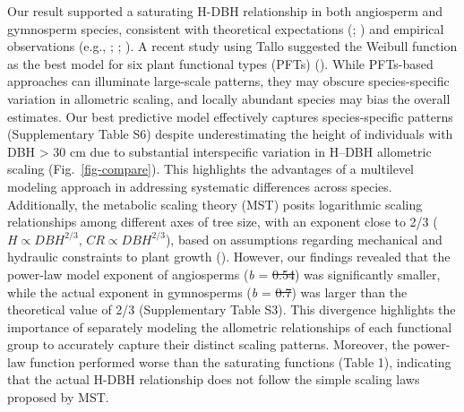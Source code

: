 \documentclass[
  12pt,
  letterpaper,
  DIV=11,
  numbers=noendperiod]{scrartcl}
\providecommand{\DIFadd}[1]{{\protect\color{blue}\uwave{#1}}} %
\providecommand{\DIFdel}[1]{{\protect\color{red}\sout{#1}}}                      %
\providecommand{\DIFaddbegin}{} %
\providecommand{\DIFaddend}{} %
\providecommand{\DIFdelbegin}{} %
\providecommand{\DIFdelend}{} %
\newcommand{\DIFscaledelfig}{0.5}
\newlength{\DIFdelgraphicswidth} %
\newlength{\DIFdelgraphicsheight} %
\newcommand{\DIFaddincludegraphics}[2][]{{\color{blue}\fbox{\DIFOincludegraphics[#1]{#2}}}} %
\newcommand{\DIFdelincludegraphics}[2][]{%
\sbox{\DIFdelgraphicsbox}{\DIFOincludegraphics[#1]{#2}}%
\settoboxwidth{\DIFdelgraphicswidth}{\DIFdelgraphicsbox} %
\settoboxtotalheight{\DIFdelgraphicsheight}{\DIFdelgraphicsbox} %
\scalebox{\DIFscaledelfig}{%
\parbox[b]{\DIFdelgraphicswidth}{\usebox{\DIFdelgraphicsbox}\\[-\baselineskip] \rule{\DIFdelgraphicswidth}{0em}}\llap{\resizebox{\DIFdelgraphicswidth}{\DIFdelgraphicsheight}{%
\setlength{\unitlength}{\DIFdelgraphicswidth}%
\begin{picture}(1,1)%
\thicklines\linethickness{2pt} %
{\color[rgb]{1,0,0}\put(0,0){\framebox(1,1){}}}%
{\color[rgb]{1,0,0}\put(0,0){\line( 1,1){1}}}%
{\color[rgb]{1,0,0}\put(0,1){\line(1,-1){1}}}%
\end{picture}%
}\hspace*{3pt}}} %
} %
\DeclareRobustCommand{\DIFaddbegin}{\DIFOaddbegin \let\includegraphics\DIFaddincludegraphics} %
\DeclareRobustCommand{\DIFaddend}{\DIFOaddend \let\includegraphics\DIFOincludegraphics} %
\DeclareRobustCommand{\DIFdelbegin}{\DIFOdelbegin \let\includegraphics\DIFdelincludegraphics} %
\DeclareRobustCommand{\DIFdelend}{\DIFOaddend \let\includegraphics\DIFOincludegraphics} %
\begin{document}
Our result supported a saturating H-DBH relationship in both angiosperm
and gymnosperm species, consistent with theoretical expectations
(;
) and empirical observations
(e.g., ;
;
). A recent study using Tallo
suggested the Weibull function as the best model for six plant
functional types (PFTs) ().
While PFTs-based approaches can illuminate large-scale patterns, they
may obscure species-specific variation in allometric scaling, and
locally abundant species may bias the overall estimates. Our best
predictive model effectively captures species-specific patterns
(Supplementary Table S6) despite underestimating the height of
individuals with DBH \textgreater{} 30 cm due to substantial
interspecific variation in H--DBH allometric scaling
(Fig.~\ref{fig-compare}). This highlights the advantages of a multilevel
modeling approach in addressing systematic differences across species.
Additionally, the metabolic scaling theory (MST) posits logarithmic
scaling relationships among different axes of tree size, with an
exponent close to 2/3 (\(H \propto DBH^{2/3}\),
\(CR \propto DBH^{2/3}\)), based on assumptions regarding mechanical and
hydraulic constraints to plant growth (). However, our findings revealed that the power-law model
exponent of angiosperms (\emph{b} = \DIFdelbegin \DIFdel{0.54}\DIFdelend \DIFaddbegin \DIFadd{0.538}\DIFaddend ) was significantly smaller,
while the actual exponent in gymnosperms (\emph{b} = \DIFdelbegin \DIFdel{0.7}\DIFdelend \DIFaddbegin \DIFadd{0.704}\DIFaddend ) was larger
than the theoretical value of 2/3 (Supplementary Table S3). This
divergence highlights the importance of separately modeling the
allometric relationships of each functional group to accurately capture
their distinct scaling patterns. Moreover, the power-law function
performed worse than the saturating functions (Table 1), indicating that
the actual H-DBH relationship does not follow the simple scaling laws
proposed by MST.
\end{document}
